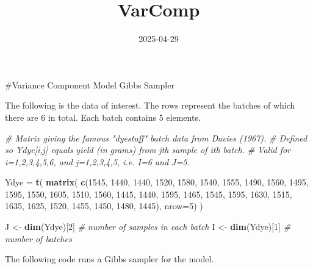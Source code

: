 \documentclass[
]{article}
\title{VarComp}
\author{}
\date{\vspace{-2.5em}2025-04-29}
\newenvironment{Shaded}{\begin{snugshade}}{\end{snugshade}}
\newcommand{\AttributeTok}[1]{\textcolor[rgb]{0.13,0.29,0.53}{#1}}
\newcommand{\CommentTok}[1]{\textcolor[rgb]{0.56,0.35,0.01}{\textit{#1}}}
\newcommand{\DecValTok}[1]{\textcolor[rgb]{0.00,0.00,0.81}{#1}}
\newcommand{\FunctionTok}[1]{\textcolor[rgb]{0.13,0.29,0.53}{\textbf{#1}}}
\newcommand{\NormalTok}[1]{#1}
\newcommand{\OtherTok}[1]{\textcolor[rgb]{0.56,0.35,0.01}{#1}}
\begin{document}
\maketitle

\#Variance Component Model Gibbs Sampler

The following is the data of interest. The rows represent the batches of
which there are 6 in total. Each batch contains 5 elements.

\begin{Shaded}
\begin{Highlighting}[]
\CommentTok{\# Matrix giving the famous "dyestuff" batch data from Davies (1967).}
\CommentTok{\# Defined so Ydye[i,j] equals yield (in grams) from j\textquotesingle{}th sample of i\textquotesingle{}th batch.}
\CommentTok{\# Valid for i=1,2,3,4,5,6, and j=1,2,3,4,5, i.e. I=6 and J=5.}

\NormalTok{Ydye }\OtherTok{=} \FunctionTok{t}\NormalTok{( }\FunctionTok{matrix}\NormalTok{(}
    \FunctionTok{c}\NormalTok{(}\DecValTok{1545}\NormalTok{, }\DecValTok{1440}\NormalTok{, }\DecValTok{1440}\NormalTok{, }\DecValTok{1520}\NormalTok{, }\DecValTok{1580}\NormalTok{,}
         \DecValTok{1540}\NormalTok{, }\DecValTok{1555}\NormalTok{, }\DecValTok{1490}\NormalTok{, }\DecValTok{1560}\NormalTok{, }\DecValTok{1495}\NormalTok{,}
         \DecValTok{1595}\NormalTok{, }\DecValTok{1550}\NormalTok{, }\DecValTok{1605}\NormalTok{, }\DecValTok{1510}\NormalTok{, }\DecValTok{1560}\NormalTok{,}
         \DecValTok{1445}\NormalTok{, }\DecValTok{1440}\NormalTok{, }\DecValTok{1595}\NormalTok{, }\DecValTok{1465}\NormalTok{, }\DecValTok{1545}\NormalTok{,}
         \DecValTok{1595}\NormalTok{, }\DecValTok{1630}\NormalTok{, }\DecValTok{1515}\NormalTok{, }\DecValTok{1635}\NormalTok{, }\DecValTok{1625}\NormalTok{,}
         \DecValTok{1520}\NormalTok{, }\DecValTok{1455}\NormalTok{, }\DecValTok{1450}\NormalTok{, }\DecValTok{1480}\NormalTok{, }\DecValTok{1445}\NormalTok{), }\AttributeTok{nrow=}\DecValTok{5}\NormalTok{) )}

\NormalTok{J }\OtherTok{\textless{}{-}} \FunctionTok{dim}\NormalTok{(Ydye)[}\DecValTok{2}\NormalTok{] }\CommentTok{\# number of samples in each batch}
\NormalTok{I }\OtherTok{\textless{}{-}} \FunctionTok{dim}\NormalTok{(Ydye)[}\DecValTok{1}\NormalTok{] }\CommentTok{\# number of batches}
\end{Highlighting}
\end{Shaded}

The following code runs a Gibbs sampler for the model.
\end{document}
